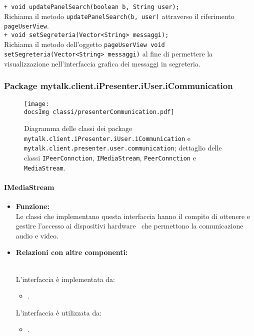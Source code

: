 {{\begin{sloppypar}
{{{\begin{itemize}
{					\texttt{+ void updatePanelSearch(boolean b, String user);}\\
					Richiama il metodo \texttt{updatePanelSearch(b, user)} attraverso il riferimento \texttt{pageUserView}.\\
					
					\texttt{+ void setSegreteria(Vector<String> messaggi);}\\
					Richiama il metodo dell'oggetto \texttt{pageUserView void setSegreteria(Vector<String> messaggi)} al fine di permettere la visualizzazione nell'interfaccia grafica dei messaggi in segreteria.\\
				}
			\end{itemize}
			}
		}
	
\newpage	
	
	\subsubsection{Package mytalk.client.iPresenter.iUser.iCommunication}	{
	
	\begin{figure}[h!tbp]
		\centering
		\label{fig:presenterCommunication}
		\texttt{[image: \\docsImg classi/presenterCommunication.pdf]}
\caption{Diagramma delle classi dei package \nolinkurl{mytalk.client.iPresenter.iUser.iCommunication} e  \nolinkurl{mytalk.client.presenter.user.communication}; dettaglio delle classi \nolinkurl{IPeerConnction}, \nolinkurl{IMediaStream}, \nolinkurl{PeerConnction} e  \nolinkurl{MediaStream}.}
	\end{figure}	
	
			\paragraph{IMediaStream}\label{par:IMediaStream}{
			\begin{itemize}
				\item[] \textbf{Funzione:}\\
					Le classi che implementano questa interfaccia hanno il compito di ottenere e gestire l'accesso ai dispositivi hardware\g~ che permettono la comunicazione audio e video.\\
			
				\item[] \textbf{Relazioni con altre componenti:}{\\
					L'interfaccia è implementata da:
					\begin{itemize}
				 		\item[]	.
					\end{itemize} 		
					L'interfaccia è utilizzata da:
					\begin{itemize}
						\item[] .\\
					\end{itemize}					
				}
				

\end{itemize}}}}
\end{sloppypar}}}
